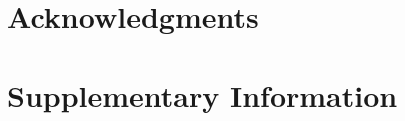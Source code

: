 \documentclass[10pt,a4paper,draft]{article}
\begin{document}
%

\section*{Acknowledgments}
%







\newpage
\section*{Supplementary Information}
\appendix
\end{document}
